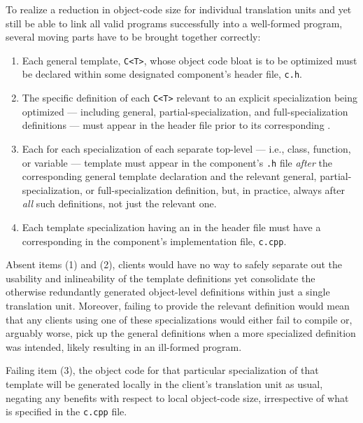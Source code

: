 To realize a reduction in object-code size for individual translation
units and yet still be able to link all valid programs successfully into
a well-formed program, several moving parts have to be brought together
correctly:
\begin{enumerate}
\item{Each general template, \lstinline!C<T>!, whose object code bloat is to be optimized must be declared within some designated component’s header file, \lstinline!c.h!.}
\item{The specific definition of each \lstinline!C<T>! relevant to an explicit specialization being optimized — including general, partial-specialization, and full-specialization definitions — must appear in the header file prior to its corresponding .}
\item{Each  for each specialization of each separate top-level — i.e., class, function, or variable — template must appear in the component’s \lstinline!.h! file \emph{after} the corresponding general template declaration and the relevant general, partial-specialization, or full-specialization definition, but, in practice, always after \emph{all} such definitions, not just the relevant one.}
\item{Each template specialization having an  in the header file must have a corresponding  in the component’s implementation file, \lstinline!c.cpp!.}
\end{enumerate}
Absent items (1) and (2), clients would have no way to safely separate
out the usability and inlineability of the template definitions yet
consolidate the otherwise redundantly generated object-level definitions
within just a single translation unit. Moreover, failing to provide the
relevant definition would mean that any clients using one of these
specializations would either fail to compile or, arguably worse, pick up
the general definitions when a more specialized definition was intended,
likely resulting in an ill-formed program.

Failing item (3), the object code for that particular specialization of
that template will be generated locally in the client's translation unit
as usual, negating any benefits with respect to local object-code size,
irrespective of what is specified in the \lstinline!c.cpp! file.

